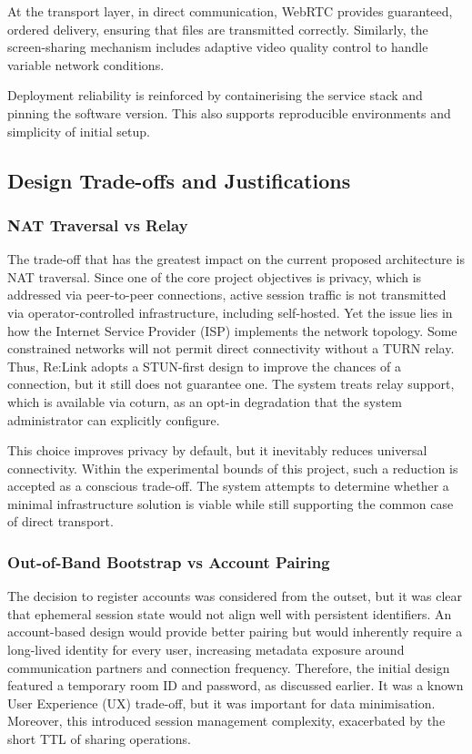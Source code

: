 \documentclass[12pt,a4paper]{article}
\begin{document}
At the transport layer, in direct communication, WebRTC provides guaranteed, ordered delivery, ensuring that files are transmitted correctly. Similarly, the screen-sharing mechanism includes adaptive video quality control to handle variable network conditions.

Deployment reliability is reinforced by containerising the service stack and pinning the software version. This also supports reproducible environments and simplicity of initial setup.

\subsection{Design Trade-offs and Justifications}

\subsubsection{NAT Traversal vs Relay}

The trade-off that has the greatest impact on the current proposed architecture is NAT traversal. Since one of the core project objectives is privacy, which is addressed via peer-to-peer connections, active session traffic is not transmitted via operator-controlled infrastructure, including self-hosted. Yet the issue lies in how the Internet Service Provider (ISP) implements the network topology. Some constrained networks will not permit direct connectivity without a TURN relay. Thus, Re:Link adopts a STUN-first design to improve the chances of a connection, but it still does not guarantee one. The system treats relay support, which is available via coturn, as an opt-in degradation that the system administrator can explicitly configure.

This choice improves privacy by default, but it inevitably reduces universal connectivity. Within the experimental bounds of this project, such a reduction is accepted as a conscious trade-off. The system attempts to determine whether a minimal infrastructure solution is viable while still supporting the common case of direct transport.

\subsubsection{Out-of-Band Bootstrap vs Account Pairing}

The decision to register accounts was considered from the outset, but it was clear that ephemeral session state would not align well with persistent identifiers. An account-based design would provide better pairing but would inherently require a long-lived identity for every user, increasing metadata exposure around communication partners and connection frequency. Therefore, the initial design featured a temporary room ID and password, as discussed earlier. It was a known User Experience (UX) trade-off, but it was important for data minimisation. Moreover, this introduced session management complexity, exacerbated by the short TTL of sharing operations.
\end{document}
